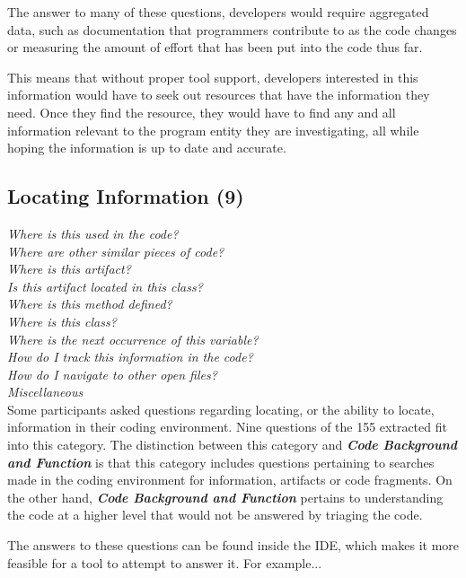\documentclass[conference]{IEEEtran}
\begin{document}
The answer to many of these questions, developers would require aggregated data, such as documentation that programmers contribute to as the code changes or measuring the amount of effort that has been put into the code thus far.

This means that without proper tool support, developers interested in this information would have to seek out resources that have the information they need. Once they find the resource, they would have to find any and all information relevant to the program entity they are investigating, all while hoping the information is up to date and accurate. 



\noindent\subsection{\textbf{Locating Information (9)}}

\noindent\emph{Where is this used in the code?} \\
\emph{Where are other similar pieces of code?} \\
\emph{Where is this artifact?} \\
\emph{Is this artifact located in this class?} \\
\emph{Where is this method defined?} \\
\emph{Where is this class? } \\
\emph{Where is the next occurrence of this variable?} \\
\emph{How do I track this information in the code?} \\
\emph{How do I navigate to other open files?} \\
\emph{Miscellaneous} \\

Some participants asked questions regarding locating, or the ability to locate, information in their coding environment. 
Nine questions of the 155 extracted fit into this category.
The distinction between this category and \emph{\textbf{Code Background and Function}} is that this category includes questions pertaining to searches made in the coding environment for information, artifacts or code fragments. 
On the other hand, \emph{\textbf{Code Background and Function}} pertains to understanding the code at a higher level that would not be answered by triaging the code.

The answers to these questions can be found inside the IDE, which makes it more feasible for a tool to attempt to answer it. For example... 
\end{document}
